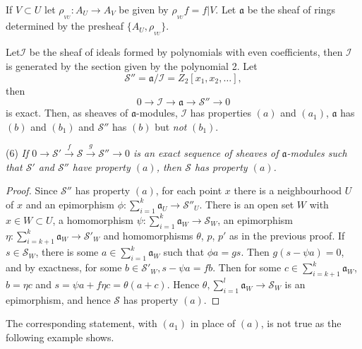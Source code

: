 If $V \subset U$ let $\rho_{_{VU}} : A_U \to A_V$ be given by
$\rho_{_{VU}} f= f|V$. Let $\mathfrak{a}$ be the sheaf of rings
determined by the presheaf $\{A_U, \rho_{_{VU}}\}$. 

Let\pageoriginale $\mathscr{I}$ be the sheaf of ideals formed by polynomials with
even coefficients, then $\mathscr{I}$ is generated by the section
given by the polynomial 2. Let 
$$
\mathscr{S}'' = \mathfrak{a}/\mathscr{I} = Z_2 [x_1, x_2, \ldots],
$$
then
$$
0 \to \mathscr{I} \to \mathfrak{a} \to \mathscr{S}'' \to 0
$$
is exact. Then, as sheaves of $\mathfrak{a}$-modules, $\mathscr{I}$ has
properties $(a)$ and $(a_1)$, $\mathfrak{a}$ has $(b)$ and $(b_1)$ and
$\mathscr{S}''$ has $(b)$ but \textit{not} $(b_1)$. 

\noindent
(6) \qquad \textit {If $0 \to \mathscr{S}' \xrightarrow{f} \mathscr{S}
  \xrightarrow{g}\mathscr{S}'' \to 0 $ is an exact sequence of sheaves
  of $\mathfrak{a}$-modules such that $\mathscr{S}'$ and
  $\mathscr{S}''$ have property $(a)$, then $\mathscr{S}$ has
  property $(a)$.}  

\begin{proof}
Since $\mathscr{S}''$ has property $(a)$, for each point $x$ there is
a neighbourhood $U$ of $x$ and an epimorphism $ \phi :
\sum^k_{i=1}\mathfrak{a}_U 
\to \mathscr{S}''_U$. There is an open set $W$ with $x \in W \subset
U$, a homomorphism $\psi : \sum ^k_{i=1} \mathfrak{a}_W \to \mathscr{S}_W$, an
epimorphism $\eta : \sum^k_{i=k+1} \mathfrak{a}_W \to \mathscr{S}'_W$ and
homomorphisms $\theta$, $p$, $p'$ as in the previous proof. If $s \in
\mathscr{S}_W$, there is some $a \in \sum^k_{i=1}\mathfrak{a}_W$ such that $\phi
a = g s$. Then $g (s- \psi a) =0$, and by exactness, for some $b \in
\mathscr{S}'_W, s-\psi a =fb$. Then for some $c \in \sum^{k}_{i=k+1}
\mathfrak{a}_W$, $b=\eta c$ and $s = \psi a + f \eta c= \theta (a+c)$. Hence
$\theta , \sum^l_{i=1} \mathfrak{a}_W \to \mathscr{S}_W$ is an \pageoriginale
epimorphism, and hence $\mathscr{S}$ has property $(a)$. 
\end{proof}

The corresponding statement, with $(a_1)$ in place of $(a)$, is not
true as the following example shows. 

